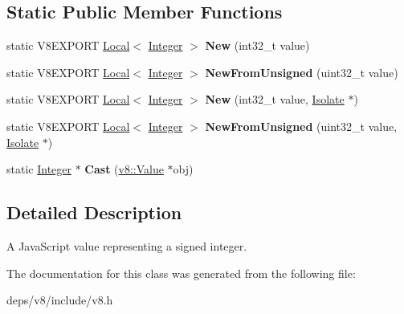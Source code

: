 \subsection*{Static Public Member Functions}
\begin{DoxyCompactItemize}
\item 
\hypertarget{classv8_1_1_integer_ab715913de664ee8934282de7b3ce4896}{}static V8\+E\+X\+P\+O\+R\+T \hyperlink{classv8_1_1_local}{Local}$<$ \hyperlink{classv8_1_1_integer}{Integer} $>$ {\bfseries New} (int32\+\_\+t value)\label{classv8_1_1_integer_ab715913de664ee8934282de7b3ce4896}

\item 
\hypertarget{classv8_1_1_integer_a5303f8909cf43e495c9524c923d5ffbe}{}static V8\+E\+X\+P\+O\+R\+T \hyperlink{classv8_1_1_local}{Local}$<$ \hyperlink{classv8_1_1_integer}{Integer} $>$ {\bfseries New\+From\+Unsigned} (uint32\+\_\+t value)\label{classv8_1_1_integer_a5303f8909cf43e495c9524c923d5ffbe}

\item 
\hypertarget{classv8_1_1_integer_a9905407109700f9821b31fff6b3d174f}{}static V8\+E\+X\+P\+O\+R\+T \hyperlink{classv8_1_1_local}{Local}$<$ \hyperlink{classv8_1_1_integer}{Integer} $>$ {\bfseries New} (int32\+\_\+t value, \hyperlink{classv8_1_1_isolate}{Isolate} $\ast$)\label{classv8_1_1_integer_a9905407109700f9821b31fff6b3d174f}

\item 
\hypertarget{classv8_1_1_integer_acff93c4ef5ab94d5534ffdf1c7f9ff5d}{}static V8\+E\+X\+P\+O\+R\+T \hyperlink{classv8_1_1_local}{Local}$<$ \hyperlink{classv8_1_1_integer}{Integer} $>$ {\bfseries New\+From\+Unsigned} (uint32\+\_\+t value, \hyperlink{classv8_1_1_isolate}{Isolate} $\ast$)\label{classv8_1_1_integer_acff93c4ef5ab94d5534ffdf1c7f9ff5d}

\item 
\hypertarget{classv8_1_1_integer_a886f73d3d8bb91f8235f66d8dccec12a}{}static \hyperlink{classv8_1_1_integer}{Integer} $\ast$ {\bfseries Cast} (\hyperlink{classv8_1_1_value}{v8\+::\+Value} $\ast$obj)\label{classv8_1_1_integer_a886f73d3d8bb91f8235f66d8dccec12a}

\end{DoxyCompactItemize}


\subsection{Detailed Description}
A Java\+Script value representing a signed integer. 

The documentation for this class was generated from the following file\+:\begin{DoxyCompactItemize}
\item 
deps/v8/include/v8.\+h\end{DoxyCompactItemize}
